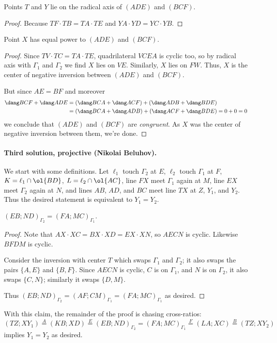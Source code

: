 \documentclass[11pt]{scrartcl}
\begin{document}
\begin{claim*}
  Points $T$ and $Y$ lie on the radical axis of $(ADE)$ and $(BCF)$.
\end{claim*}
\begin{proof}
  Because $TF \cdot TB = TA \cdot TE$ and $YA \cdot YD = YC \cdot YB$.
\end{proof}

\begin{claim*}
  Point $X$ has equal power to $(ADE)$ and $(BCF)$.
\end{claim*}
\begin{proof}
  Since $TV \cdot TC = TA \cdot TE$, quadrilateral $VCEA$ is cyclic too,
  so by radical axis with $\Gamma_1$ and $\Gamma_2$ we find $X$ lies on $VE$.
  Similarly, $X$ lies on $FW$.
  Thus, $X$ is the center of negative inversion between $(ADE)$ and $(BCF)$.

  But since $AE = BF$ and moreover
  \begin{align*}
    \dang BCF + \dang ADE
    &= (\dang BCA + \dang ACF) + (\dang ADB + \dang BDE) \\
    &= (\dang BCA + \dang ADB) + (\dang ACF + \dang BDE) = 0 + 0 = 0
  \end{align*}
  we conclude that $(ADE)$ and $(BCF)$ are \emph{congruent}.
  As $X$ was the center of negative inversion between them, we're done.
\end{proof}

\paragraph{Third solution, projective (Nikolai Beluhov).}
We start with some definitions.
Let $\ell_1$ touch $\Gamma_2$ at $E$, $\ell_2$ touch $\Gamma_1$ at $F$,
$K = \ell_1 \cap \ol{BD}$, $L = \ell_2 \cap \ol{AC}$,
line $FX$ meet $\Gamma_1$ again at $M$,
line $EX$ meet $\Gamma_2$ again at $N$,
and lines $AB$, $AD$, and $BC$ meet line $TX$ at $Z$, $Y_1$, and $Y_2$.
Thus the desired statement is equivalent to $Y_1 = Y_2$.

\begin{claim*}
  $(EB; ND)_{\Gamma_2} = (FA; MC)_{\Gamma_1}$.
\end{claim*}

\begin{proof}
  Note that $AX \cdot XC = BX \cdot XD = EX \cdot XN$, so $AECN$ is cyclic.
  Likewise $BFDM$ is cyclic.

  Consider the inversion with center $T$ which swaps $\Gamma_1$ and $\Gamma_2$;
  it also swaps the pairs $\{A, E\}$ and $\{B, F\}$.
  Since $AECN$ is cyclic, $C$ is on $\Gamma_1$, and $N$ is on $\Gamma_2$,
  it also swaps $\{C, N\}$; similarly it swaps $\{D, M\}$.

  Thus $(EB; ND)_{\Gamma_2} = (AF; CM)_{\Gamma_1} = (FA; MC)_{\Gamma_1}$ as desired.
\end{proof}
With this claim, the remainder of the proof is chasing cross-ratios:
\[
  (TZ; XY_1)
  \stackrel{A}{=} (KB; XD)
  \stackrel{E}{=} (EB; ND)_{\Gamma_2}
  = (FA; MC)_{\Gamma_1}
  \stackrel{F}{=} (LA; XC)
  \stackrel{B}{=} (TZ; XY_2)
\]
implies $Y_1 = Y_2$ as desired.
\end{document}
